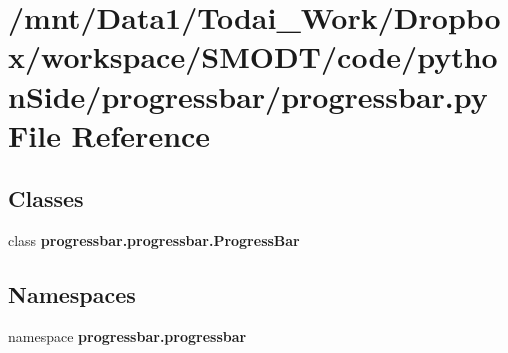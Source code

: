 \section{/mnt/\-Data1/\-Todai\-\_\-\-Work/\-Dropbox/workspace/\-S\-M\-O\-D\-T/code/python\-Side/progressbar/progressbar.py File Reference}
\label{progressbar_8py}
\subsection*{Classes}
\begin{DoxyCompactItemize}
\item 
class {\bf progressbar.\-progressbar.\-Progress\-Bar}
\end{DoxyCompactItemize}
\subsection*{Namespaces}
\begin{DoxyCompactItemize}
\item 
namespace {\bf progressbar.\-progressbar}
\end{DoxyCompactItemize}
